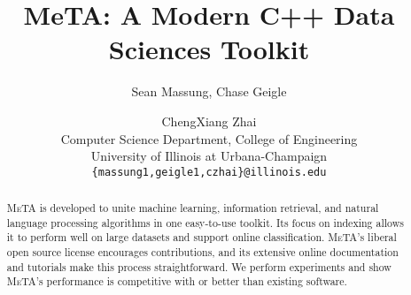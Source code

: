 \documentclass[11pt]{article}
\title{MeTA: A Modern C++ Data Sciences Toolkit} %
\author{Sean Massung, Chase Geigle \and ChengXiang Zhai \\
            Computer Science Department, College of Engineering \\
            University of Illinois at Urbana-Champaign \\
            {\tt \{massung1,geigle1,czhai\}@illinois.edu}
}
\date{}
\def\meta/{\textsc{MeTA}}
\begin{document}
\maketitle

\begin{abstract}
\meta/ is developed to unite machine learning, information retrieval, and
natural language processing algorithms in one easy-to-use toolkit. Its focus on
indexing allows it to perform well on large datasets and support online
classification. \meta/'s liberal open source license encourages contributions,
and its extensive online documentation and tutorials make this process
straightforward. We perform experiments and show \meta/'s performance is
competitive with or better than existing software.
\end{abstract}










\end{document}
